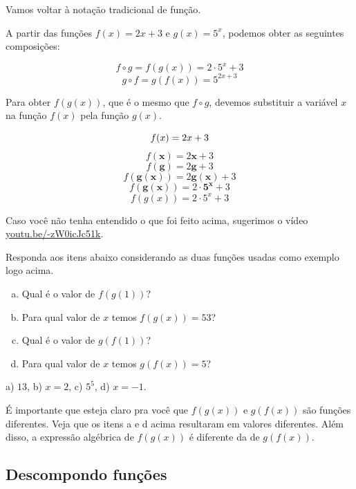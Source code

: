 \documentclass[main.tex]{subfiles}
\begin{document}
Vamos voltar à notação tradicional de função.

\begin{caixaExemplo}
A partir das funções $f(x)=2x+3$ e $g(x)=5^x$, podemos obter as seguintes composições:

$$ f \circ g = f(g(x)) = 2 \cdot 5^x + 3 $$
$$ g \circ f = g(f(x)) = 5^{2x+3}$$
\end{caixaExemplo}

Para obter $f(g(x))$, que é o mesmo que $f \circ g$, devemos substituir a variável $x$ na função $f(x)$ pela função $g(x)$.

$$ f(x)=2x+3 \newline $$
$$ f(\mathbf{x})=2 \mathbf{x}+3  $$
$$ f(\mathbf{g})=2 \mathbf{g}+3  $$
$$ f(\mathbf{g(x)})=2 \mathbf{g(x)}+3  $$
$$ f(\mathbf{g(x)})=2 \cdot \mathbf{5^x}+3  $$
$$f(g(x))=2 \cdot 5^x+3  $$

Caso você não tenha entendido o que foi feito acima, sugerimos o vídeo \href{https://youtu.be/-zW0icJc51k}{youtu.be/-zW0icJc51k}.

\begin{questao}
Responda aos itens abaixo considerando as duas funções usadas como exemplo logo acima.
\begin{enumerate}[a)]
\item Qual é o valor de $f(g(1))$?
\item Para qual valor de $x$ temos $f(g(x))=53$?
\item Qual é o valor de $g(f(1))$?
\item Para qual valor de $x$ temos $g(f(x))=5$?
\end{enumerate}
\end{questao}


\begin{gabarito}
	\begin{gabaritoQuestao}
		a) $13$, b) $x=2$, c) $5^5$, d) $x=-1$.
	\end{gabaritoQuestao}
\end{gabarito}

É importante que esteja claro pra você que $f(g(x))$ e $g(f(x))$ são funções diferentes. Veja que os itens a e d acima resultaram em valores diferentes. Além disso, a expressão algébrica de $f(g(x))$ é diferente da de $g(f(x))$.

\subsection*{Descompondo funções}
\end{document}

